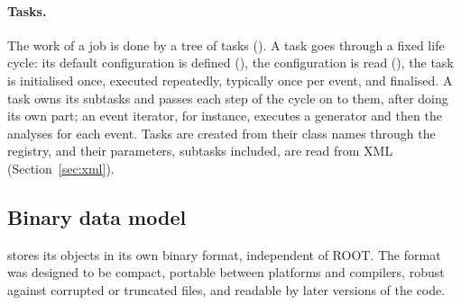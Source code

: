 \paragraph{Tasks.}
The work of a job is done by a tree of tasks (). A task goes through a fixed life cycle: its default
configuration is defined (), the configuration is read (), the task
is initialised once, executed repeatedly, typically once per event, and finalised. A task owns its subtasks and
passes each step of the cycle on to them, after doing its own part; an event iterator, for instance, executes a
generator and then the analyses for each event. Tasks are created from their class names through the registry,
and their parameters, subtasks included, are read from XML (Section~\ref{sec:xml}).

\subsection{Binary data model}
\label{sec:binary}

\Datum{} stores its objects in its own binary format, independent of ROOT. The format was designed to be compact,
portable between platforms and compilers, robust against corrupted or truncated files, and readable by later
versions of the code.

